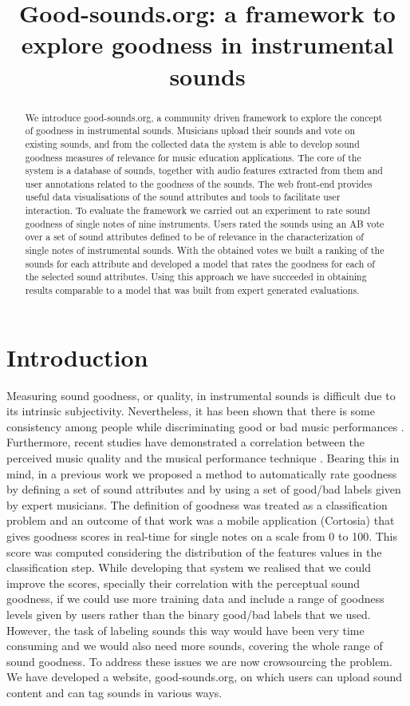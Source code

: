 \documentclass{article}
\title{Good-sounds.org: a framework to explore goodness in instrumental sounds}
\begin{document}
%
\maketitle
%
\begin{abstract}
We introduce good-sounds.org, a community driven framework to explore the concept of goodness in instrumental sounds. Musicians upload their sounds and vote on existing sounds, and from the collected data the system is able to develop sound goodness measures of relevance for music education applications. The core of the system is a database of sounds, together with audio features extracted from them and user annotations related to the goodness of the sounds. The web front-end provides useful data visualisations of the sound attributes and tools to facilitate user interaction. To evaluate the framework we carried out an experiment to rate sound goodness of single notes of nine  instruments. Users rated the sounds using an AB vote over a set of sound attributes defined to be of relevance in the characterization of single notes of instrumental sounds. With the obtained votes we built a ranking of the sounds for each attribute and developed a model that rates the goodness for each of the selected sound attributes. Using this approach we have succeeded in obtaining results comparable to a model that was built from expert generated evaluations.
\end{abstract}
%
\section{Introduction}\label{sec:introduction}

Measuring sound goodness, or quality, in instrumental sounds is difficult due to its intrinsic subjectivity. Nevertheless, it has been shown that there is some consistency among people while discriminating good or bad music performances \cite{1}. Furthermore, recent studies have demonstrated a correlation between the perceived music quality and the musical performance technique \cite{2}. Bearing this in mind, in a previous work \cite{01} we proposed a method to automatically rate goodness by defining a set of sound attributes and by using a set of good/bad labels given by expert musicians. The definition of goodness was treated as a classification problem and an outcome of that work was a mobile application (Cortosia) that gives goodness scores in real-time for single notes on a scale from 0 to 100. This score was computed considering the distribution of the features values in the classification step. While developing that system we realised that we could improve the scores, specially their correlation with the perceptual sound goodness, if we could use more training data and include a range of goodness levels given by users rather than the binary good/bad labels that we used. However, the task of labeling sounds this way would have been very time consuming and we would  also need more sounds, covering the whole range of sound goodness. To address these issues we are now crowsourcing the problem. We have developed a website, good-sounds.org, on which users can upload sound content and can tag sounds in various ways.      
%
\end{document}
